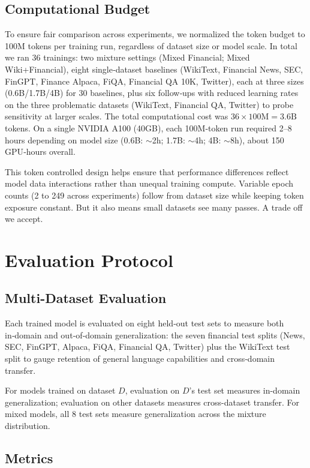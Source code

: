 \subsection{Computational Budget}

To ensure fair comparison across experiments, we normalized the token budget to 100M tokens per training run, regardless of dataset size or model scale. In total we ran 36 trainings: two mixture settings (Mixed Financial; Mixed Wiki+Financial), eight single‑dataset baselines (WikiText, Financial News, SEC, FinGPT, Finance Alpaca, FiQA, Financial QA 10K, Twitter), each at three sizes (0.6B/1.7B/4B) for 30 baselines, plus six follow‑ups with reduced learning rates on the three problematic datasets (WikiText, Financial QA, Twitter) to probe sensitivity at larger scales. The total computational cost was $36\times100\text{M}=3.6\text{B}$ tokens. On a single NVIDIA A100 (40GB), each 100M‑token run required 2–8 hours depending on model size (0.6B: $\sim$2h; 1.7B: $\sim$4h; 4B: $\sim$8h), about 150 GPU‑hours overall.

This token controlled design helps ensure that performance differences reflect model data interactions rather than unequal training compute. Variable epoch counts (2 to 249 across experiments) follow from dataset size while keeping token exposure constant. But it also means small datasets see many passes. A trade off we accept.

\section{Evaluation Protocol}

\subsection{Multi-Dataset Evaluation}

Each trained model is evaluated on eight held‑out test sets to measure both in‑domain and out‑of‑domain generalization: the seven financial test splits (News, SEC, FinGPT, Alpaca, FiQA, Financial QA, Twitter) plus the WikiText test split to gauge retention of general language capabilities and cross‑domain transfer.

For models trained on dataset $D$, evaluation on $D$'s test set measures in-domain generalization; evaluation on other datasets measures cross-dataset transfer. For mixed models, all 8 test sets measure generalization across the mixture distribution.

\subsection{Metrics}

